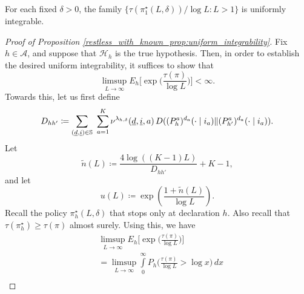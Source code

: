 \begin{prop}\label{restless_with_known_prop:uniform_integrability}
	For each fixed $\delta>0$, the family $\{\tau(\pi_1^\star(L,\delta))/\log L:L>1\}$ is uniformly integrable.
\end{prop}

\begin{proof}[Proof of Proposition \ref{restless_with_known_prop:uniform_integrability}]
Fix $h\in\mathcal{A}$, and suppose that $\mathcal{H}_h$ is the true hypothesis. Then, in order to establish the desired uniform integrability, it suffices to show that
	\begin{equation}
	\limsup\limits_{L\to\infty}E_h\bigg[\exp\bigg(\frac{\tau(\pi)}{\log L}\bigg)\bigg]<\infty.
\end{equation}
Towards this, let us first define
\begin{equation}
	D_{hh'}\coloneqq \sum\limits_{(\underline{d},\underline{i})\in\mathbb{S}}\,\,\sum\limits_{a=1}^{K}\nu^{\lambda_{h,\delta}}(\underline{d},\underline{i},a)\,D((P_h^a)^{d_a}(\cdot\mid i_a)\|(P_{h'}^a)^{d_a}(\cdot\mid i_a)).\label{restless_with_known_eq:D_{hh'}}
\end{equation}
Let
\begin{equation}
	\tilde{n}(L)\coloneqq \frac{4\log((K-1)L)}{D_{hh'}}+K-1,\label{restless_with_known_eq:n_tilde}
\end{equation}
and let
\begin{equation}
	u(L)\coloneqq \exp\left(\frac{1+\tilde{n}(L)}{\log L}\right).\label{restless_with_known_eq:u(L)}
\end{equation}
Recall the policy $\pi^\star_h(L,\delta)$ that stops only at declaration $h$. Also recall that $\tau(\pi^\star_h)\geq \tau(\pi)$ almost surely. Using this, we have
\begingroup\allowdisplaybreaks\begin{align}
	&\limsup\limits_{L\to\infty}E_h\bigg[\exp\bigg(\frac{\tau(\pi)}{\log L}\bigg)\bigg]\nonumber\\
	&=\limsup\limits_{L\to\infty}\int\limits_{0}^{\infty}P_h\bigg(\frac{\tau(\pi)}{\log L}>\log x\bigg)\,dx\nonumber\\

\end{align}
\end{proof}

